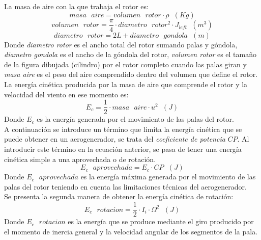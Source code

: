La masa de aire con la que trabaja el rotor es:
\begin{equation}
    masa \text{ } aire = volumen \text{ } rotor \cdot \rho \hspace{7pt} (Kg)
\label{def:masa_aire}
\end{equation}
\begin{equation}
    volumen \text{ } rotor = \dfrac{\pi}{4} \cdot diametro \text{ } rotor^2 \cdot J_{left} \hspace{7pt} (m^3) 
\end{equation}
\begin{equation}
     diametro \text{ } rotor = 2L + diametro \text{ } gondola \hspace{7pt} (m)
\end{equation}
Donde \textit{diametro rotor} es el ancho total del rotor sumando palas y góndola, \textit{diametro gondola} es el ancho de la góndola del rotor, \textit{volumen rotor} es el tamaño de la figura dibujada (cilindro) por el rotor completo cuando las palas giran y \textit{masa aire} es el peso del aire comprendido dentro del volumen que define el rotor.\\

La energía cinética producida por la masa de aire que comprende el rotor y la velocidad del viento en ese momento es:
\begin{equation}
    E_c = \dfrac{1}{2} \cdot masa \text{ } aire \cdot u^2 \hspace{7pt} (J)
\end{equation}
Donde $E_c$ es la energía generada por el movimiento de las palas del rotor.\\

A continuación se introduce un término que limita la energía cinética que se puede obtener en un aerogenerador, se trata del \textit{coeficiente de potencia} $CP$. Al introducir este término en la ecuación anterior, se pasa de tener una energía cinética simple a una aprovechada o de rotación.\\

\begin{equation}
    E_c \text{ } aprovechada = E_c \cdot CP \hspace{7pt} (J)
\end{equation}
Donde $E_c \text{ } aprovechada$ es la energía máxima generada por el movimiento de las palas del rotor teniendo en cuenta las limitaciones técnicas del aerogenerador.\\

Se presenta la segunda manera de obtener la energía cinética de rotación:
\begin{equation}
    E_c  \text{ } rotacion = \dfrac{1}{2} \cdot I_i \cdot \Omega^2  \hspace{7pt} (J)
\end{equation}
Donde $E_c \text{ } rotacion$ es la energía que se produce mediante el giro producido por el momento de inercia general y la velocidad angular de los segmentos de la pala. \\


